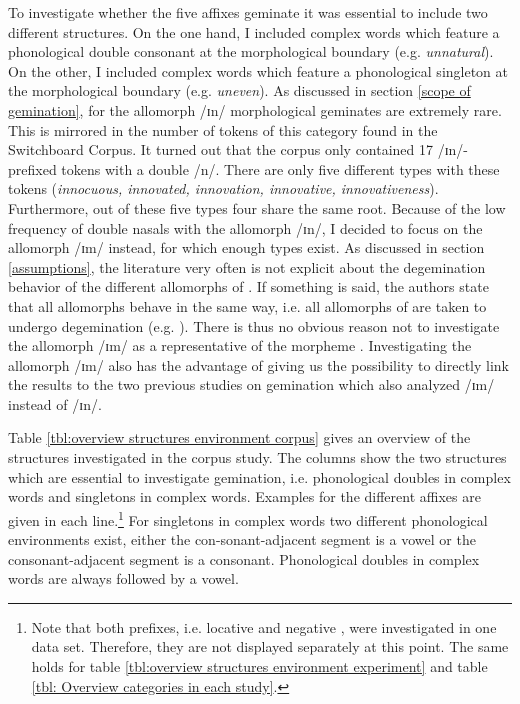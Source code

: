 To investigate whether the five affixes geminate it was essential to include two different structures. On the one hand, I included complex words which feature a phonological double consonant at the morphological boundary (e.g. \textit{unnatural}). On the other, I included complex words which feature a phonological singleton at the morphological boundary (e.g. \textit{uneven}). 
As discussed in section \ref{scope of gemination}, for the allomorph /ɪn/ morphological geminates are extremely rare. This is mirrored in the number of tokens of this category found in the Switchboard Corpus. It turned out that the corpus only contained 17 /ɪn/-prefixed tokens with a double /n/. There are only five different types with these tokens (\textit{innocuous, innovated, innovation, innovative, innovativeness}). Furthermore, out of these five types four share the same root. Because of the low frequency of double nasals with the allomorph /ɪn/, I decided to focus on the allomorph /ɪm/ instead, for which enough types exist. 
As discussed in section \ref{assumptions}, the literature very often is not explicit about the degemination behavior of the different allomorphs of . If something is said, the authors state that all allomorphs behave in the same way, i.e. all allomorphs of  are taken to undergo degemination (e.g. \citealt{Borowsky.1986, Cruttenden.2014}). There is thus no obvious reason not to investigate the allomorph /ɪm/ as a representative of the morpheme .  Investigating the allomorph /ɪm/ also has the advantage of giving us the possibility to directly link the results to the two previous studies on gemination which also analyzed /ɪm/ instead of /ɪn/. 

Table \ref{tbl:overview structures environment corpus} gives an overview of  the structures investigated in the corpus study. The columns show the two structures which are essential to investigate gemination, i.e. phonological doubles in complex words and singletons in complex words. Examples for the different affixes are given in each line.\footnote{Note that both prefixes, i.e. locative and negative , were investigated in one data set. Therefore, they are not displayed separately at this point. The same holds for table \ref{tbl:overview structures environment experiment} and table \ref{tbl: Overview categories in each study}.} 
For singletons in complex words two different phonological environments exist, either the con-sonant-adjacent segment is a vowel or the consonant-adjacent segment is a consonant. Phonological doubles in complex words are always followed by a vowel. 



